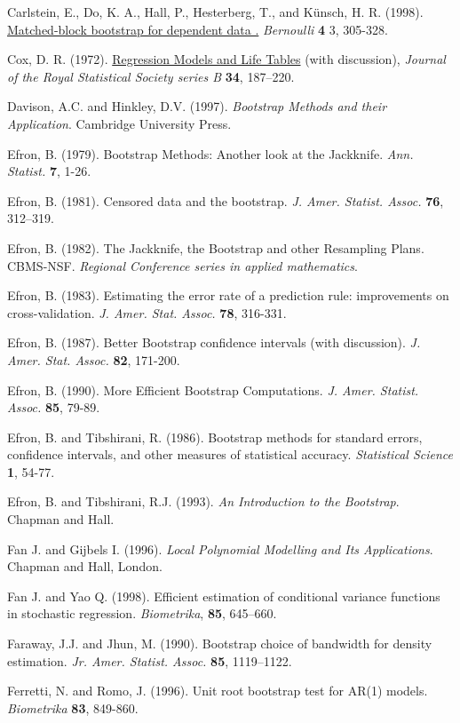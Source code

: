\documentclass[]{book}
\theoremstyle{break}
\theoremstyle{definition}
\theoremstyle{definition}
\theoremstyle{definition}
\theoremstyle{remark}
\begin{document}
Carlstein, E., Do, K. A., Hall, P., Hesterberg, T., and Künsch, H. R.
(1998).
\href{https://projecteuclid.org/euclid.bj/1174324983}{Matched-block
bootstrap for dependent data .} \emph{Bernoulli} \textbf{4} 3, 305-328.

Cox, D. R. (1972).
\href{https://rss.onlinelibrary.wiley.com/doi/abs/10.1111/j.2517-6161.1972.tb00899.x}{Regression
Models and Life Tables} (with discussion), \emph{Journal of the Royal
Statistical Society series B} \textbf{34}, 187--220.

Davison, A.C. and Hinkley, D.V. (1997). \emph{Bootstrap Methods and
their Application}. Cambridge University Press.

Efron, B. (1979). Bootstrap Methods: Another look at the Jackknife.
\emph{Ann. Statist.} \textbf{7}, 1-26.

Efron, B. (1981). Censored data and the bootstrap. \emph{J. Amer.
Statist. Assoc.} \textbf{76}, 312--319.

Efron, B. (1982). The Jackknife, the Bootstrap and other Resampling
Plans. CBMS-NSF. \emph{Regional Conference series in applied
mathematics}.

Efron, B. (1983). Estimating the error rate of a prediction rule:
improvements on cross-validation. \emph{J. Amer. Stat. Assoc.}
\textbf{78}, 316-331.

Efron, B. (1987). Better Bootstrap confidence intervals (with
discussion). \emph{J. Amer. Stat. Assoc.} \textbf{82}, 171-200.

Efron, B. (1990). More Efficient Bootstrap Computations. \emph{J. Amer.
Statist. Assoc.} \textbf{85}, 79-89.

Efron, B. and Tibshirani, R. (1986). Bootstrap methods for standard
errors, confidence intervals, and other measures of statistical
accuracy. \emph{Statistical Science} \textbf{1}, 54-77.

Efron, B. and Tibshirani, R.J. (1993). \emph{An Introduction to the
Bootstrap}. Chapman and Hall.

Fan J. and Gijbels I. (1996). \emph{Local Polynomial Modelling and Its
Applications}. Chapman and Hall, London.

Fan J. and Yao Q. (1998). Efficient estimation of conditional variance
functions in stochastic regression. \emph{Biometrika}, \textbf{85},
645--660.

Faraway, J.J. and Jhun, M. (1990). Bootstrap choice of bandwidth for
density estimation. \emph{Jr. Amer. Statist. Assoc.} \textbf{85},
1119--1122.

Ferretti, N. and Romo, J. (1996). Unit root bootstrap test for AR(1)
models. \emph{Biometrika} \textbf{83}, 849-860.
\end{document}
